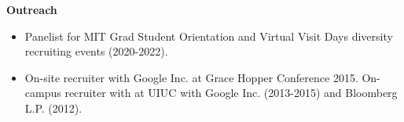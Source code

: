 \documentclass[centered,overlapped]{res}
\begin{document}
\begin{resume}
%

  \textbf{Outreach}
  \begin{itemize}  \itemsep -2pt
  \item Panelist for MIT Grad Student Orientation and Virtual Visit Days diversity recruiting events (2020-2022).
  \item On-site recruiter with Google Inc. at Grace Hopper Conference 2015. On-campus recruiter with at UIUC with Google Inc. (2013-2015) and Bloomberg L.P. (2012).
  \end{itemize}


\end{resume}
\end{document}
